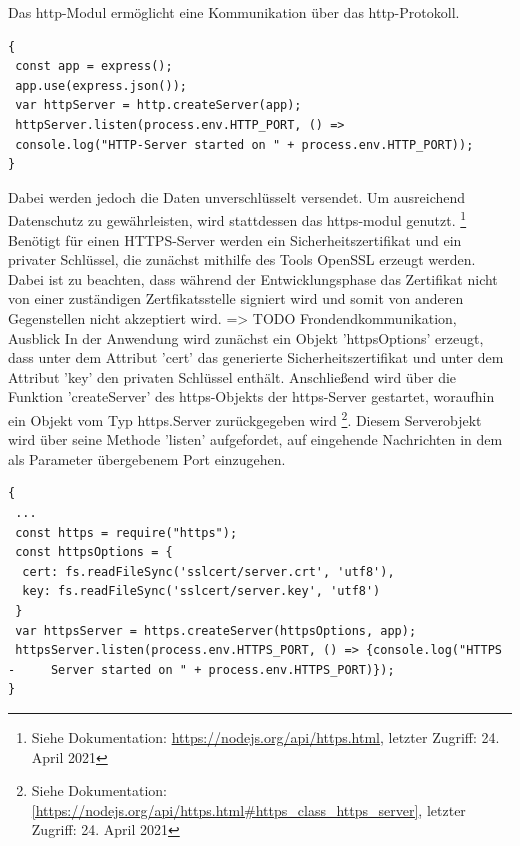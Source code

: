 Das http-Modul ermöglicht eine Kommunikation über das http-Protokoll.\\
 
\begin{lstlisting}[caption=Einfache Verbindung, label=lst:nodejs_easyconnection]
{
 const app = express();
 app.use(express.json()); 
 var httpServer = http.createServer(app);
 httpServer.listen(process.env.HTTP_PORT, () => 
 console.log("HTTP-Server started on " + process.env.HTTP_PORT));
}
\end{lstlisting}

\noindent
Dabei werden jedoch die Daten unverschlüsselt versendet. Um ausreichend Datenschutz zu gewährleisten, wird stattdessen das https-modul genutzt. \footnote{Siehe Dokumentation: \url{https://nodejs.org/api/https.html}, letzter Zugriff: 24. April 2021}
\newline
Benötigt für einen HTTPS-Server werden ein Sicherheitszertifikat und ein privater Schlüssel, die zunächst mithilfe des Tools OpenSSL erzeugt werden.  
Dabei ist zu beachten, dass während der Entwicklungsphase das Zertifikat nicht von einer zuständigen Zertfikatsstelle signiert wird und somit von anderen Gegenstellen nicht akzeptiert wird. => TODO Frondendkommunikation, Ausblick
\newline
In der Anwendung wird zunächst ein Objekt 'httpsOptions' erzeugt, dass unter dem Attribut 'cert' das generierte Sicherheitszertifikat und unter dem Attribut 'key' den privaten Schlüssel enthält. Anschließend wird über die Funktion 'createServer' des https-Objekts der https-Server gestartet, woraufhin ein Objekt vom Typ https.Server zurückgegeben wird \footnote{Siehe Dokumentation:  \url{[https://nodejs.org/api/https.html\#https_class_https_server]}, letzter Zugriff: 24. April 2021}. 
Diesem Serverobjekt wird über seine Methode 'listen' aufgefordet, auf eingehende Nachrichten in dem als Parameter übergebenem Port einzugehen.\\

\begin{lstlisting}[caption=Gesicherte Verbindung, label=lst:nodejs_safeconnection]
{
 ...
 const https = require("https");
 const httpsOptions = {
  cert: fs.readFileSync('sslcert/server.crt', 'utf8'),
  key: fs.readFileSync('sslcert/server.key', 'utf8')
 }
 var httpsServer = https.createServer(httpsOptions, app);
 httpsServer.listen(process.env.HTTPS_PORT, () => {console.log("HTTPS - 	Server started on " + process.env.HTTPS_PORT)});
}
\end{lstlisting}


